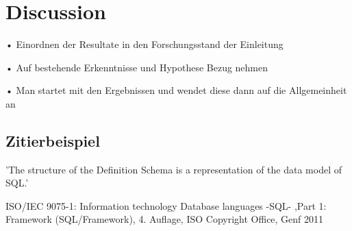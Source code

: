 \documentclass[12pt,twocolumn,twoside]{conference}   %
\begin{document}
\section{Discussion}
\begin{list}{•}
\item[•] Einordnen der Resultate in den Forschungsstand der Einleitung
\item[•] Auf bestehende Erkenntnisse und Hypothese Bezug nehmen
\item[•] Man startet mit den Ergebnissen und wendet diese dann auf die Allgemeinheit an
\end{list}


\subsection{Zitierbeispiel}
'The structure of the Definition Schema is a representation of the data model of SQL.' \cite{ISO9075-1:2011}


\newpage

\begin{thebibliography}{99}
	
	ISO/IEC 9075-1: Information technology
	Database languages -SQL- ,Part 1: Framework
	(SQL/Framework), 4. Auflage, ISO Copyright Office,
	Genf 2011
	
	
\end{thebibliography}
\end{document}
